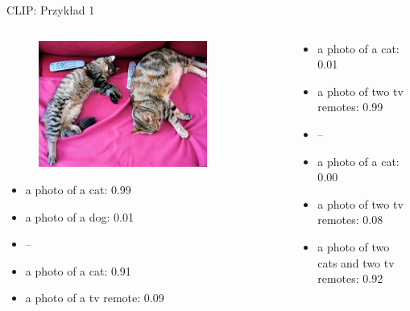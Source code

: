 \documentclass{beamer}
\begin{document}
\begin{frame}{CLIP: Przykład 1}
  \begin{columns}
    \begin{column}{0.5\textwidth}
      \begin{figure}
        \centering
        \includegraphics[width=0.8\textwidth]{../../img/remote_cats.jpg}
      \end{figure}
      \begin{itemize}
        \item a photo of a cat: 0.99
        \item a photo of a dog: 0.01
        \item --
        \item a photo of a cat: 0.91
        \item a photo of a tv remote: 0.09
      \end{itemize}
    \end{column}
    \begin{column}{0.5\textwidth}
      \begin{itemize}
        \item a photo of a cat: 0.01
        \item a photo of two tv remotes: 0.99
        \item --
        \item a photo of a cat: 0.00
        \item a photo of two tv remotes: 0.08
        \item a photo of two cats and two tv remotes: 0.92
      \end{itemize}
    \end{column}
  \end{columns}
\end{frame}
\end{document}
